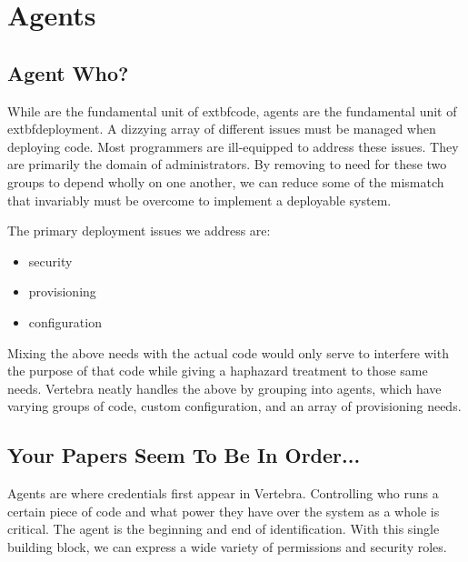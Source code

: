 \newcommand{\agent}{{\sf agent}}
\newcommand{\agents}{{\sf agents}}
\newcommand{\Agent}{{\sf Agent}}
\newcommand{\Agents}{{\sf Agents}}

\section{Agents}

\subsection{Agent Who?}

While \actors{} are the fundamental unit of         extbf{code}, \agents{} are the fundamental unit of         extbf{deployment}.  A dizzying array of different issues must be managed when deploying code.  Most programmers are ill-equipped to address these issues.  They are primarily the domain of administrators.  By removing to need for these two groups to depend wholly on one another, we can reduce some of the mismatch that invariably must be overcome to implement a deployable system.

The primary deployment issues we address are:

\begin{itemize}
        \item security
        \item provisioning
        \item configuration
\end{itemize}

Mixing the above needs with the actual code would only serve to interfere with the purpose of that code while giving a haphazard treatment to those same needs.  Vertebra neatly handles the above by grouping \actors{} into \agents{}, which have varying groups of \actor{} code, custom configuration, and an array of provisioning needs.

\subsection{Your Papers Seem To Be In Order...}

\Agents{} are where credentials first appear in Vertebra.  Controlling who runs a certain piece of code and what power they have over the system as a whole is critical.  The \agent{} is the beginning and end of identification.  With this single building block, we can express a wide variety of permissions and security roles.


